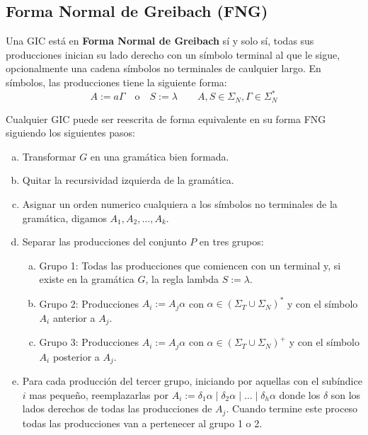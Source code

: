 \documentclass[12pt]{article}
\begin{document}
\subsection{Forma Normal de Greibach (FNG)}
Una GIC está en \textbf{Forma Normal de Greibach} sí y solo sí, todas sus producciones inician su lado derecho con un símbolo terminal al que le sigue, opcionalmente una cadena símbolos no terminales de caulquier largo. En símbolos, las producciones tiene la siguiente forma:
\[
A:=a\Gamma \quad \text{o} \quad S:=\lambda \qquad A,S \in \Sigma_{N}, \Gamma \in \Sigma_{N}^{*}
\]

Cualquier GIC puede ser reescrita de forma equivalente en su forma FNG siguiendo los siguientes pasos:
\begin{enumerate}[a)]
  \item Transformar $ G $ en una gramática bien formada.

  \item Quitar la recursividad izquierda de la gramática.

  \item Asignar un orden numerico cualquiera a los símbolos no terminales de la gramática, digamos $ A_{1}, A_{2},\dots ,A_{k} $.

  \item Separar las producciones del conjunto $ P $ en tres grupos:
	  \begin{enumerate}[a.]
	    \item Grupo 1: Todas las producciones que comiencen con un terminal y, si existe en la gramática $ G $, la regla lambda $ S:=\lambda $.

	    \item Grupo 2: Producciones $ A_{i}:=A_{j}\alpha $ con $ \alpha \in \left(\Sigma_{T} \cup \Sigma_{N}\right)^{*} $ y con el símbolo $ A_{i} $ anterior a $ A_{j} $.

	    \item Grupo 3: Producciones $ A_{i}:=A_{j}\alpha $ con $ \alpha \in \left(\Sigma_{T} \cup \Sigma_{N}\right)^{+} $ y con el símbolo $ A_{i} $ posterior a $ A_{j} $.
	  \end{enumerate}

	  \item Para cada producción del tercer grupo, iniciando por aquellas con el subíndice $ i $ mas pequeño, reemplazarlas por $ A_{i}:=\delta_{1}\alpha \mid \delta_{2}\alpha \mid \dots  \mid \delta_{h}\alpha $ donde los $ \delta $ son los lados derechos de todas las producciones de $ A_{j} $. Cuando termine este proceso todas las producciones van a pertenecer al grupo 1 o 2.


\end{enumerate}
\end{document}
